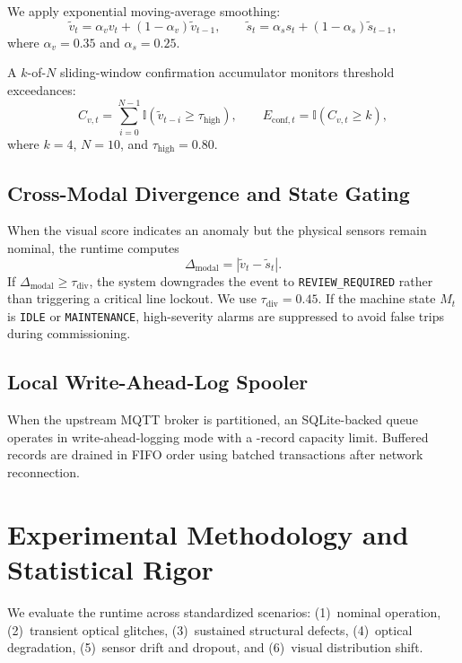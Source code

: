 \documentclass[conference]{IEEEtran}
\begin{document}
We apply exponential moving-average smoothing:
\begin{equation}
\tilde{v}_t = \alpha_v v_t + (1-\alpha_v)\tilde{v}_{t-1}, \qquad \tilde{s}_t = \alpha_s s_t + (1-\alpha_s)\tilde{s}_{t-1},
\end{equation}
where $\alpha_v=0.35$ and $\alpha_s=0.25$.

A $k$-of-$N$ sliding-window confirmation accumulator monitors threshold exceedances:
\begin{equation}
C_{v,t} = \sum_{i=0}^{N-1} \mathbb{I}\!\left(\tilde{v}_{t-i}\geq\tau_{\mathrm{high}}\right), \qquad E_{\mathrm{conf},t} = \mathbb{I}\!\left(C_{v,t}\geq k\right),
\end{equation}
where $k=4$, $N=10$, and $\tau_{\mathrm{high}}=0.80$.

\subsection{Cross-Modal Divergence and State Gating}
When the visual score indicates an anomaly but the physical sensors remain nominal, the runtime computes
\begin{equation}
\Delta_{\mathrm{modal}} = \left|\tilde{v}_t-\tilde{s}_t\right|.
\end{equation}
If $\Delta_{\mathrm{modal}}\geq\tau_{\mathrm{div}}$, the system downgrades the event to \texttt{REVIEW\_REQUIRED} rather than triggering a critical line lockout. We use $\tau_{\mathrm{div}}=0.45$. If the machine state $M_t$ is \texttt{IDLE} or \texttt{MAINTENANCE}, high-severity alarms are suppressed to avoid false trips during commissioning.

\subsection{Local Write-Ahead-Log Spooler}
When the upstream MQTT broker is partitioned, an SQLite-backed queue operates in write-ahead-logging mode with a \SpoolBufferCapacity{}-record capacity limit. Buffered records are drained in FIFO order using batched transactions after network reconnection.

\section{Experimental Methodology and Statistical Rigor}

We evaluate the runtime across \TotalWorkloadScenarios{} standardized scenarios: (1)~nominal operation, (2)~transient optical glitches, (3)~sustained structural defects, (4)~optical degradation, (5)~sensor drift and dropout, and (6)~visual distribution shift.
\end{document}
